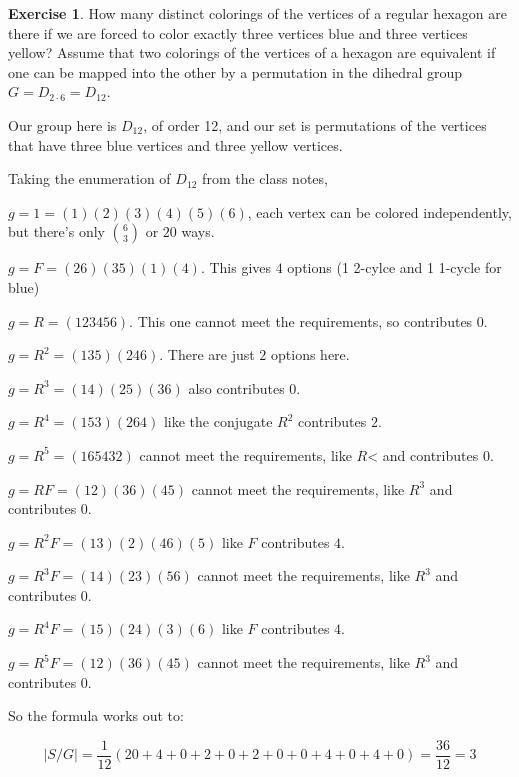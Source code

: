 \documentclass[11pt,oneside]{article}
\numberwithin{equation}{section}
\theoremstyle{definition}
\newtheorem{exercise}{Exercise}
\begin{document}
\begin{exercise}
  How many distinct colorings of the vertices of a regular hexagon are
  there if we are forced to color exactly three vertices blue and
  three vertices yellow?  Assume that two colorings of the vertices of
  a hexagon are equivalent if one can be mapped into the other by a
  permutation in the dihedral group $G = D_{2 \cdot 6} = D_{12}$.
\end{exercise}
\begin{solution}

  Our group here is $D_{12}$, of order 12, and our set is permutations
  of the vertices that have three blue vertices and three yellow
  vertices.

  Taking the enumeration of $D_{12}$ from the class notes,

  $g = 1 = (1) (2) (3) (4) (5) (6)$, each vertex can be colored
  independently, but there's only ${6 \choose 3}$ or $20$ ways.

  $g = F = (2 6) (3 5) (1) (4)$.  This gives $4$ options (1 2-cylce and 1 1-cycle for blue)

  $g = R = (1 2 3 4 5 6)$.  This one cannot meet the requirements, so contributes $0$.

  $g = R^2 = (1 3 5)(2 4 6)$.  There are just $2$ options here.

  $g = R^3 = (1 4) ( 2 5) ( 3 6)$ also contributes $0$.

  $g = R^4 = (1 5 3) (2 6 4) $ like the conjugate $R^2$ contributes $2$.

  $g = R^5 = (1 6 5 4 3 2) $ cannot meet the requirements, like $R$< and contributes $0$.

  $g = RF = (1 2 ) ( 3 6) (4 5) $ cannot meet the requirements, like $R^3$ and contributes $0$.

  $g = R^2F = (1 3) (2 ) (4 6) (5) $ like $F$ contributes $4$.

  $g = R^3F = (1 4 ) (2 3) (5 6) $ cannot meet the requirements, like $R^3$ and contributes $0$.

  $g = R^4F = (1 5) (2 4) (3) (6) $ like $F$ contributes $4$.
  
  $g = R^5F = (1 2 ) ( 3 6) (4 5) $ cannot meet the requirements, like $R^3$ and contributes $0$.
  

  So the formula works out to:

  \[ | S / G | = \frac{1}{12} ( 20 + 4 + 0 + 2 + 0 + 2 + 0 + 0 + 4 + 0 + 4 + 0 ) = \frac{36}{12} = 3
  \]

  
  
\end{solution}
\end{document}
